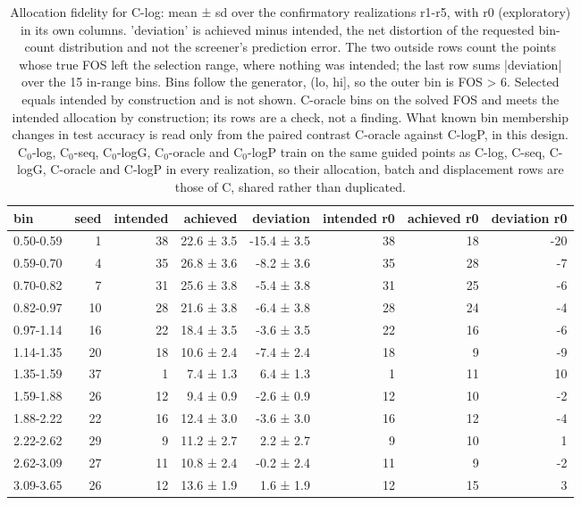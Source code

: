 \begin{table}[htbp]
\centering
\small
\setlength{\tabcolsep}{4pt}
\caption{Allocation fidelity for C-log: mean ± sd over the confirmatory realizations r1-r5, with r0 (exploratory) in its own columns. 'deviation' is achieved minus intended, the net distortion of the requested bin-count distribution and not the screener's prediction error. The two outside rows count the points whose true FOS left the selection range, where nothing was intended; the last row sums |deviation| over the 15 in-range bins. Bins follow the generator, (lo, hi], so the outer bin is FOS > 6. Selected equals intended by construction and is not shown. C-oracle bins on the solved FOS and meets the intended allocation by construction; its rows are a check, not a finding. What known bin membership changes in test accuracy is read only from the paired contrast C-oracle against C-logP, in this design. C$_0$-log, C$_0$-seq, C$_0$-logG, C$_0$-oracle and C$_0$-logP train on the same guided points as C-log, C-seq, C-logG, C-oracle and C-logP in every realization, so their allocation, batch and displacement rows are those of C, shared rather than duplicated.}
\label{tab:structural:allocation:c-log}
\begin{tabular}{lrrrrrrr}
\toprule
bin & seed & intended & achieved & deviation & intended r0 & achieved r0 & deviation r0 \\
\midrule
0.50-0.59 & 1 & 38 & 22.6 ± 3.5 & -15.4 ± 3.5 & 38 & 18 & -20 \\
0.59-0.70 & 4 & 35 & 26.8 ± 3.6 & -8.2 ± 3.6 & 35 & 28 & -7 \\
0.70-0.82 & 7 & 31 & 25.6 ± 3.8 & -5.4 ± 3.8 & 31 & 25 & -6 \\
0.82-0.97 & 10 & 28 & 21.6 ± 3.8 & -6.4 ± 3.8 & 28 & 24 & -4 \\
0.97-1.14 & 16 & 22 & 18.4 ± 3.5 & -3.6 ± 3.5 & 22 & 16 & -6 \\
1.14-1.35 & 20 & 18 & 10.6 ± 2.4 & -7.4 ± 2.4 & 18 & 9 & -9 \\
1.35-1.59 & 37 & 1 & 7.4 ± 1.3 & 6.4 ± 1.3 & 1 & 11 & 10 \\
1.59-1.88 & 26 & 12 & 9.4 ± 0.9 & -2.6 ± 0.9 & 12 & 10 & -2 \\
1.88-2.22 & 22 & 16 & 12.4 ± 3.0 & -3.6 ± 3.0 & 16 & 12 & -4 \\
2.22-2.62 & 29 & 9 & 11.2 ± 2.7 & 2.2 ± 2.7 & 9 & 10 & 1 \\
2.62-3.09 & 27 & 11 & 10.8 ± 2.4 & -0.2 ± 2.4 & 11 & 9 & -2 \\
3.09-3.65 & 26 & 12 & 13.6 ± 1.9 & 1.6 ± 1.9 & 12 & 15 & 3 \\

\end{tabular}
\end{table}
